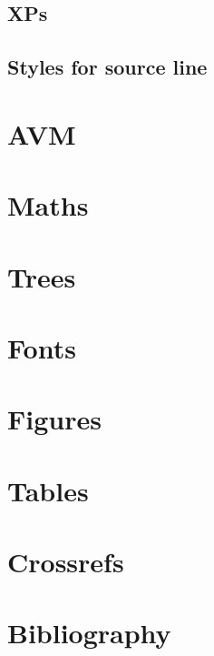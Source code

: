 \documentclass[output=book
  ,colorlinks
  ,showindex
  ,tblseight
  ,nobabel
    ,booklanguage=spanish
  ]{langscibook}
\begin{document}
\subsection{XPs}




\subsection{Styles for source line}




\section{AVM}
% 
% 

\section{Maths}


\section{Trees}


\section{Fonts}

% 


\section{Figures}\label{sec:tables}

\section{Tables}\label{sec:tables}



\section{Crossrefs}


\section{Bibliography}

% 
\end{document}
